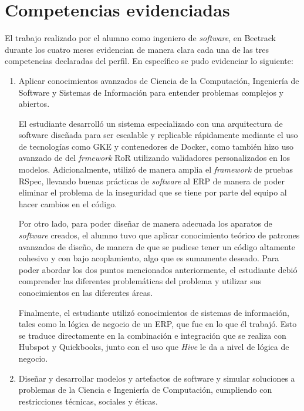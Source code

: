 \section{Competencias evidenciadas}

  El trabajo realizado por el alumno como ingeniero de \textit{software}, en Beetrack durante los cuatro meses evidencian de manera clara cada una de las tres competencias declaradas del perfil. En específico se pudo evidenciar lo siguiente:

  \begin{enumerate}
    \item Aplicar conocimientos avanzados de Ciencia de la Computación, Ingeniería de Software y Sistemas de Información para entender problemas complejos y abiertos.
    
    El estudiante desarrolló un sistema especializado con una arquitectura de software diseñada para ser escalable y replicable rápidamente mediante el uso de tecnologías como GKE y contenedores de Docker, como también hizo uso avanzado de del \textit{frmework} RoR utilizando validadores personalizados en los modelos. Adicionalmente, utilizó de manera amplia el \textit{framework} de pruebas RSpec, llevando buenas prácticas de \textit{software} al ERP de manera de poder eliminar el problema de la inseguridad que se tiene por parte del equipo al hacer cambios en el código.

    Por otro lado, para poder diseñar de manera adecuada los aparatos de \textit{software} creados, el alumno tuvo que aplicar conocimiento teórico de patrones avanzados de diseño, de manera de que se pudiese tener un código altamente cohesivo y con bajo acoplamiento, algo que es sumamente deseado. Para poder abordar los dos puntos mencionados anteriormente, el estudiante debió comprender las diferentes problemáticas del problema y utilizar sus conocimientos en las diferentes áreas.

    Finalmente, el estudiante utilizó conocimientos de sistemas de información, tales como la lógica de negocio de un ERP, que fue en lo que él trabajó. Esto se traduce directamente en la combinación e integración que se realiza con Hubspot y Quickbooks, junto con el uso que \textit{Hive} le da a nivel de lógica de negocio.

    \item Diseñar y desarrollar modelos y artefactos de software y simular soluciones a problemas de la Ciencia e Ingeniería de Computación, cumpliendo con restricciones técnicas, sociales y éticas.
    

\end{enumerate}
